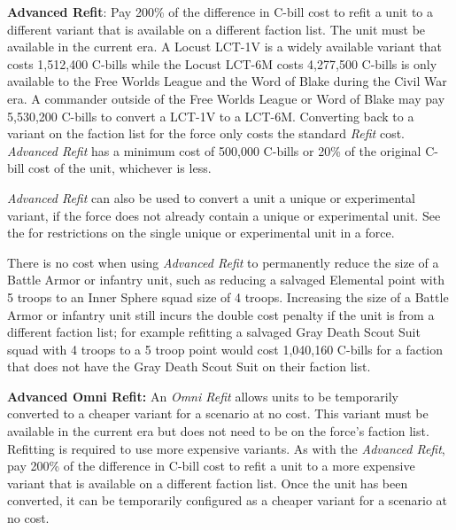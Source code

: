 \item {\bfseries Advanced Refit}: Pay 200\% of the difference in C-bill cost to refit a unit to a different variant that is available on a different faction list.
The unit must be available in the current era.
A Locust LCT-1V is a widely available variant that costs 1,512,400 C-bills while the Locust LCT-6M costs 4,277,500 C-bills is only available to the Free Worlds League and the Word of Blake during the Civil War era.
A commander outside of the Free Worlds League or Word of Blake may pay 5,530,200 C-bills to convert a LCT-1V to a LCT-6M.
Converting back to a variant on the faction list for the force only costs the standard \emph{Refit} cost.
\emph{Advanced Refit} has a minimum cost of 500,000 C-bills or 20\% of the original C-bill cost of the unit, whichever is less.

\emph{Advanced Refit} can also be used to convert a unit a unique or experimental variant, if the force does not already contain a unique or experimental unit.
See the  for restrictions on the single unique or experimental unit in a force.

There is no cost when using \emph{Advanced Refit} to permanently reduce the size of a Battle Armor or infantry unit, such as reducing a salvaged Elemental point with 5 troops to an Inner Sphere squad size of 4 troops.
Increasing the size of a Battle Armor or infantry unit still incurs the double cost penalty if the unit is from a different faction list; for example refitting a salvaged Gray Death Scout Suit squad with 4 troops to a 5 troop point would cost 1,040,160 C-bills for a faction that does not have the Gray Death Scout Suit on their faction list.

\item {\bfseries Advanced Omni Refit:} An \emph{Omni Refit} allows units to be temporarily converted to a cheaper variant for a scenario at no cost.
This variant must be available in the current era but does not need to be on the force's faction list.
Refitting is required to use more expensive variants.
As with the \emph{Advanced Refit}, pay 200\% of the difference in C-bill cost to refit a unit to a more expensive variant that is available on a different faction list.
Once the unit has been converted, it can be temporarily configured as a cheaper variant for a scenario at no cost.
